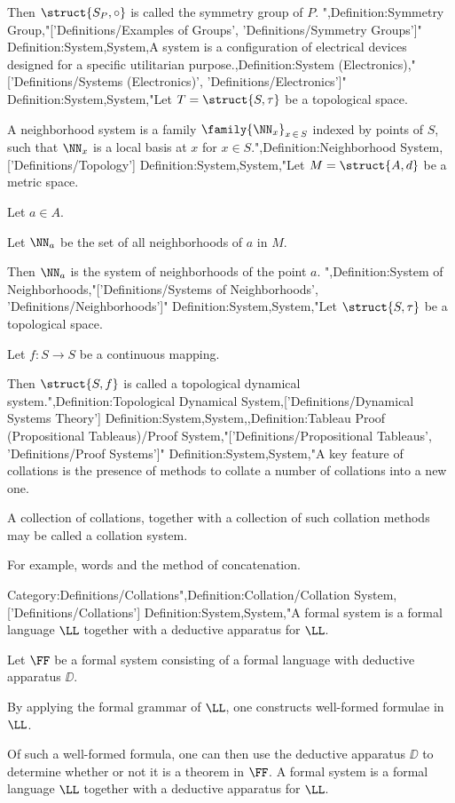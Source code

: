 Then $\struct {S_P, \circ}$ is called the symmetry group of $P$.
",Definition:Symmetry Group,"['Definitions/Examples of Groups', 'Definitions/Symmetry Groups']"
Definition:System,System,A system is a configuration of electrical devices designed for a specific utilitarian purpose.,Definition:System (Electronics),"['Definitions/Systems (Electronics)', 'Definitions/Electronics']"
Definition:System,System,"Let $T = \struct {S, \tau}$ be a topological space.

A neighborhood system is a family $\family {\NN_x}_{x \mathop \in S}$ indexed by points of $S$, such that $\NN_x$ is a local basis at $x$ for $x \in S$.",Definition:Neighborhood System,['Definitions/Topology']
Definition:System,System,"Let $M = \struct {A, d}$ be a metric space.

Let $a \in A$.

Let $\NN_a$ be the set of all neighborhoods of $a$ in $M$.


Then $\NN_a$ is the system of neighborhoods of the point $a$.
",Definition:System of Neighborhoods,"['Definitions/Systems of Neighborhoods', 'Definitions/Neighborhoods']"
Definition:System,System,"Let $\struct {S, \tau}$ be a topological space.

Let $f: S \to S$ be a continuous mapping.


Then $\struct {S, f}$ is called a topological dynamical system.",Definition:Topological Dynamical System,['Definitions/Dynamical Systems Theory']
Definition:System,System,,Definition:Tableau Proof (Propositional Tableaus)/Proof System,"['Definitions/Propositional Tableaus', 'Definitions/Proof Systems']"
Definition:System,System,"A key feature of collations is the presence of methods to collate a number of collations into a new one.

A collection of collations, together with a collection of such collation methods may be called a collation system.


For example, words and the method of concatenation.


Category:Definitions/Collations",Definition:Collation/Collation System,['Definitions/Collations']
Definition:System,System,"A formal system is a formal language $\LL$ together with a deductive apparatus for $\LL$.


Let $\FF$ be a formal system consisting of a formal language with deductive apparatus $\DD$.

By applying the formal grammar of $\LL$, one constructs well-formed formulae in $\LL$.

Of such a well-formed formula, one can then use the deductive apparatus $\DD$ to determine whether or not it is a theorem in $\FF$.
A formal system is a formal language $\LL$ together with a deductive apparatus for $\LL$.


